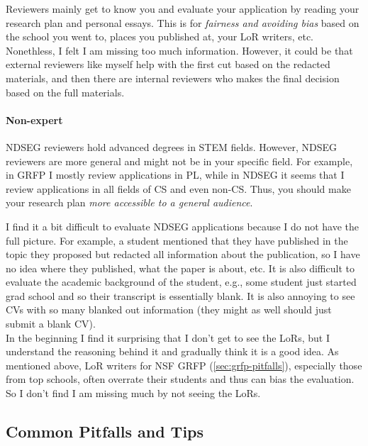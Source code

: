 \documentclass[oneside,11pt]{book}
\newenvironment{commentbox}[1][]{
  \small
  \begin{marker}[\faChessPawn{}]
    {\textbf{#1}}
  }{
  \end{marker}
}
\begin{document}
Reviewers mainly get to know you and evaluate your application by reading your research plan and personal essays. This is for \emph{fairness and avoiding bias} based on the school you went to, places you published at, your LoR writers, etc.  Nonethless, I felt I am missing too much information. However, it could be that external reviewers like myself help with the first cut based on the redacted materials, and then there are internal reviewers who makes the final decision based on the full materials. 

\paragraph{Non-expert} NDSEG reviewers hold advanced degrees in STEM fields. However, NDSEG reviewers are more general and might not be in your specific field. For example, in GRFP I mostly review applications in PL, while in NDSEG it seems that I review applications in all fields of CS and even non-CS.  Thus, you should make your research plan \emph{more accessible to a general audience}.

\begin{commentbox}
I find it a bit difficult to evaluate NDSEG applications because I do not have the full picture.  For example, a student mentioned that they have published in the topic they proposed but redacted all information about the publication, so I have no idea where they published, what the paper is about, etc.  
It is also difficult to evaluate the academic background of the student, e.g., some student just started grad school and so their transcript is essentially blank. It is also annoying to see CVs with so many blanked out information (they might as well should just submit a blank CV).
\\

In the beginning I find it surprising that I don't get to see the LoRs, but I understand the reasoning behind it and gradually think it is a good idea. As mentioned above, LoR writers for NSF GRFP (\autoref{sec:grfp-pitfalls}), especially those from top schools, often overrate their students and thus can bias the evaluation. So I don't find I am missing much by not seeing the LoRs.
\end{commentbox}

\subsection{Common Pitfalls and Tips}\label{sec:ndseg-pitfalls}
\end{document}
